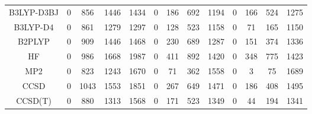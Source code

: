 \begin{table}[ht]
\begin{tabular}{ccccccccccccc}
B3LYP-D3BJ & 0 & 856 & 1446 & 1434 & 0 & 186 & 692 & 1194 & 0 & 166 & 524 & 1275 \\ 
B3LYP-D4 & 0 & 861 & 1279 & 1297 & 0 & 128 & 523 & 1158 & 0 & 71 & 165 & 1150 \\ 
B2PLYP & 0 & 909 & 1446 & 1468 & 0 & 230 & 689 & 1287 & 0 & 151 & 374 & 1336 \\ 
HF & 0 & 986 & 1668 & 1987 & 0 & 411 & 892 & 1420 & 0 & 348 & 775 & 1423 \\ 
MP2 & 0 & 823 & 1243 & 1670 & 0 & 71 & 362 & 1558 & 0 & 3 & 75 & 1689 \\ 
CCSD & 0 & 1043 & 1553 & 1851 & 0 & 267 & 649 & 1471 & 0 & 186 & 408 & 1495 \\ 
CCSD(T) & 0 & 880 & 1313 & 1568 & 0 & 171 & 523 & 1349 & 0 & 44 & 194 & 1341 \\ 
\hline\hline
\end{tabular}
\end{table}